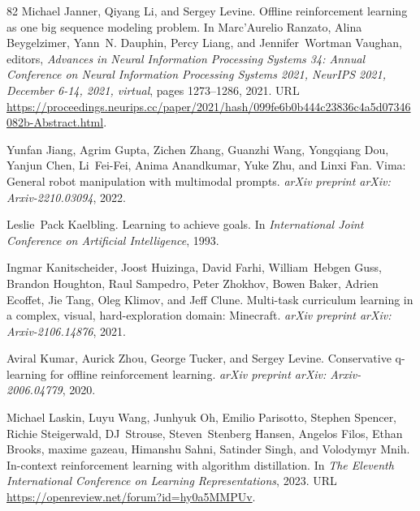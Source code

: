 \documentclass{article}
\begin{document}
\begin{thebibliography}{82}
Michael Janner, Qiyang Li, and Sergey Levine.
\newblock Offline reinforcement learning as one big sequence modeling problem.
\newblock In Marc'Aurelio Ranzato, Alina Beygelzimer, Yann~N. Dauphin, Percy Liang, and Jennifer~Wortman Vaughan, editors, \emph{Advances in Neural Information Processing Systems 34: Annual Conference on Neural Information Processing Systems 2021, NeurIPS 2021, December 6-14, 2021, virtual}, pages 1273--1286, 2021.
\newblock URL \url{https://proceedings.neurips.cc/paper/2021/hash/099fe6b0b444c23836c4a5d07346082b-Abstract.html}.

Yunfan Jiang, Agrim Gupta, Zichen Zhang, Guanzhi Wang, Yongqiang Dou, Yanjun Chen, Li~Fei-Fei, Anima Anandkumar, Yuke Zhu, and Linxi Fan.
\newblock Vima: General robot manipulation with multimodal prompts.
\newblock \emph{arXiv preprint arXiv: Arxiv-2210.03094}, 2022.

Leslie~Pack Kaelbling.
\newblock Learning to achieve goals.
\newblock In \emph{International Joint Conference on Artificial Intelligence}, 1993.

Ingmar Kanitscheider, Joost Huizinga, David Farhi, William~Hebgen Guss, Brandon Houghton, Raul Sampedro, Peter Zhokhov, Bowen Baker, Adrien Ecoffet, Jie Tang, Oleg Klimov, and Jeff Clune.
\newblock Multi-task curriculum learning in a complex, visual, hard-exploration domain: Minecraft.
\newblock \emph{arXiv preprint arXiv: Arxiv-2106.14876}, 2021.

Aviral Kumar, Aurick Zhou, George Tucker, and Sergey Levine.
\newblock Conservative q-learning for offline reinforcement learning.
\newblock \emph{arXiv preprint arXiv: Arxiv-2006.04779}, 2020.

Michael Laskin, Luyu Wang, Junhyuk Oh, Emilio Parisotto, Stephen Spencer, Richie Steigerwald, DJ~Strouse, Steven~Stenberg Hansen, Angelos Filos, Ethan Brooks, maxime gazeau, Himanshu Sahni, Satinder Singh, and Volodymyr Mnih.
\newblock In-context reinforcement learning with algorithm distillation.
\newblock In \emph{The Eleventh International Conference on Learning Representations}, 2023.
\newblock URL \url{https://openreview.net/forum?id=hy0a5MMPUv}.


\end{thebibliography}
\end{document}
